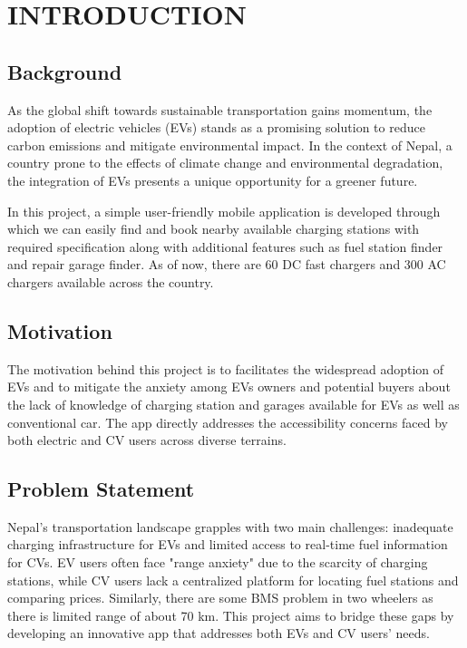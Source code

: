 \newpage
{}

\section{INTRODUCTION}
\subsection{Background}
As the global shift towards sustainable transportation gains momentum, the adoption of electric vehicles (EVs) stands as a promising solution to reduce carbon emissions and mitigate environmental impact. In the context of Nepal, a country prone to the effects of climate change and environmental degradation, the integration of EVs presents a unique opportunity for a greener future.

In this project, a simple user-friendly mobile application is developed through which we can easily find and book nearby available charging stations with required specification along with additional features such as fuel station finder and repair garage finder. As of now, there are 60 DC fast chargers and 300 AC chargers available across the country.

\subsection{Motivation}
The motivation behind this project is to  facilitates the widespread adoption of EVs and to mitigate the anxiety among EVs owners and potential buyers about the lack of knowledge of charging station and garages available for EVs as well as conventional car. The app directly addresses the accessibility concerns faced by both electric and CV users across diverse terrains.

\subsection{Problem Statement}
Nepal's transportation landscape grapples with two main challenges: inadequate charging infrastructure for EVs and limited access to real-time fuel information for CVs. \cite{Mehrjerdi2019Electric}EV users often face "range anxiety" due to the scarcity of charging stations, while CV users lack a centralized platform for locating fuel stations and comparing prices. Similarly, there are some BMS problem in two wheelers as there is limited range of about 70 km. This project aims to bridge these gaps by developing an innovative app that addresses both EVs and CV users' needs.

